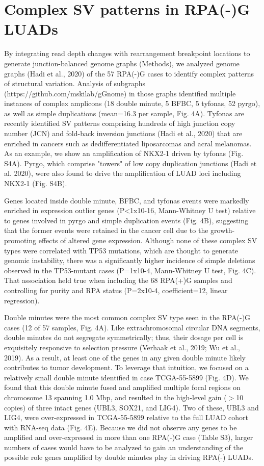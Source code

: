 \documentclass[phd,tocprelim]{cornell}
\begin{document}
\section{Complex SV patterns in RPA(-)G LUADs}

By integrating read depth changes with rearrangement breakpoint locations to generate junction-balanced genome graphs (Methods), we analyzed genome graphs (Hadi et al., 2020) of the 57 RPA(-)G cases to identify complex patterns of structural variation. Analysis of subgraphs (https://github.com/mskilab/gGnome) in those graphs identified multiple instances of complex amplicons (18 double minute, 5 BFBC, 5 tyfonas, 52 pyrgo), as well as simple duplications (mean=16.3 per sample, Fig. 4A). Tyfonas are recently identified SV patterns comprising hundreds of high junction copy number (JCN) and fold-back inversion junctions (Hadi et al., 2020) that are enriched in cancers such as dedifferentiated liposarcomas and acral melanomas. As an example, we show an amplification of NKX2-1 driven by tyfonas (Fig. S4A). Pyrgo, which comprise "towers" of low copy duplication junctions (Hadi et al. 2020), were also found to drive the amplification of LUAD loci including NKX2-1 (Fig. S4B). 

Genes located inside double minute, BFBC, and tyfonas events were markedly enriched in expression outlier genes (P<1x10-16, Mann-Whitney U test) relative to genes involved in pyrgo and simple duplication events (Fig. 4B), suggesting that the former events were retained in the cancer cell due to the growth-promoting effects of altered gene expression. Although none of these complex SV types were correlated with TP53 mutations, which are thought to generate genomic instability, there was a significantly higher incidence of simple deletions observed in the TP53-mutant cases (P=1x10-4, Mann-Whitney U test, Fig. 4C). That association held true when including the 68 RPA(+)G samples and controlling for purity and RPA status (P=2x10-4, coefficient=12, linear regression).

Double minutes were the most common complex SV type seen in the RPA(-)G cases (12 of 57 samples, Fig. 4A). Like extrachromosomal circular DNA segments, double minutes do not segregate symmetrically; thus, their dosage per cell is exquisitely responsive to selection pressure (Verhaak et al., 2019; Wu et al., 2019). As a result, at least one of the genes in any given double minute likely contributes to tumor development. To leverage that intuition, we focused on a relatively small double minute identified in case TCGA-55-5899 (Fig. 4D). We found that this double minute fused and amplified multiple focal regions on chromosome 13 spanning 1.0 Mbp, and resulted in the high-level gain ($>$10 copies) of three intact genes (UBL3, SOX21, and LIG4). Two of these, UBL3 and LIG4, were over-expressed in TCGA-55-5899 relative to the full LUAD cohort with RNA-seq data (Fig. 4E). Because we did not observe any genes to be amplified and over-expressed in more than one RPA(-)G case (Table S3), larger numbers of cases would have to be analyzed to gain an understanding of the possible role genes amplified by double minutes play in driving RPA(-) LUADs.  
\end{document}
